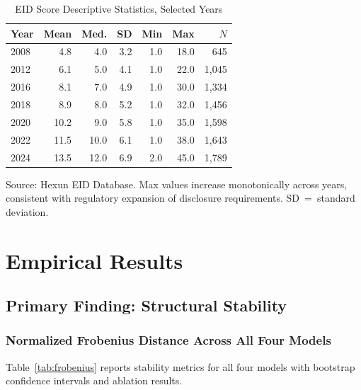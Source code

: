 \documentclass[12pt]{article}
\begin{document}
\begin{table}[H]
\centering
\caption{EID Score Descriptive Statistics, Selected Years}
\label{tab:eid_descriptives}
\small
\begin{tabular}{lrrrrrr}
\toprule
Year & Mean & Med. & SD & Min & Max & $N$ \\
\midrule
2008 & 4.8 & 4.0 & 3.2 & 1.0 & 18.0 & 645 \\
2012 & 6.1 & 5.0 & 4.1 & 1.0 & 22.0 & 1,045 \\
2016 & 8.1 & 7.0 & 4.9 & 1.0 & 30.0 & 1,334 \\
2018 & 8.9 & 8.0 & 5.2 & 1.0 & 32.0 & 1,456 \\
2020 & 10.2 & 9.0 & 5.8 & 1.0 & 35.0 & 1,598 \\
2022 & 11.5 & 10.0 & 6.1 & 1.0 & 38.0 & 1,643 \\
2024 & 13.5 & 12.0 & 6.9 & 2.0 & 45.0 & 1,789 \\
\bottomrule
\end{tabular}
\begin{tablenotes}
\footnotesize
\item Source: Hexun EID Database. Max values increase monotonically
across years, consistent with regulatory expansion of disclosure
requirements. SD~=~standard deviation.
\end{tablenotes}
\end{table}

\section{Empirical Results}
\label{sec:results}

\subsection{Primary Finding: Structural Stability}

\subsubsection{Normalized Frobenius Distance Across All Four Models}

Table~\ref{tab:frobenius} reports stability metrics for all four models
with bootstrap confidence intervals and ablation results.
\end{document}
